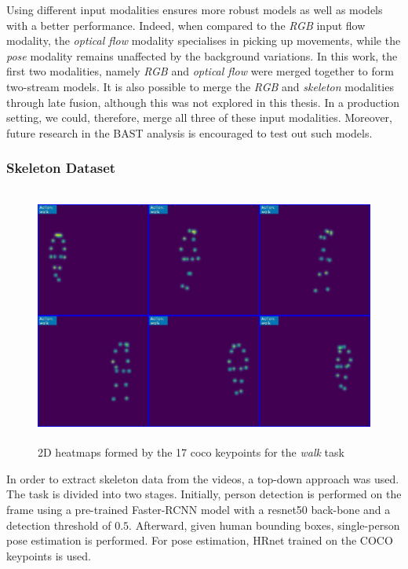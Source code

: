 \documentclass[extern,palatino]{cgMA}
\begin{document}
\bigskip
\noindent Using different input modalities ensures more robust models as well as models with a better performance. Indeed, when compared to the \textit{RGB} input flow modality, the \textit{optical flow} modality specialises in picking up movements, while the \textit{pose} modality remains unaffected by the background variations. In this work, the first two modalities, namely \textit{RGB} and \textit{optical flow} were merged together to form two-stream models. It is also possible to merge the \textit{RGB} and \textit{skeleton} modalities through late fusion, although this was not explored in this thesis. In a production setting, we could, therefore, merge all three of these input modalities. Moreover, future research in the BAST analysis is encouraged to test out such models.

\subsubsection{Skeleton Dataset}

\begin{figure}[h]
\center
\includegraphics[height={240pt}, width={370pt}]{Thesis/images/walk_heatmap.jpg}
\caption{2D heatmaps formed by the 17 coco keypoints for the \textit{walk} task}
\label{walk_heatmap}
\end{figure}

\noindent In order to extract skeleton data from the videos, a top-down approach was used. The task is divided into two stages. Initially, person detection is performed on the frame using a pre-trained Faster-RCNN model \cite{ren2015faster} with a resnet50 back-bone and a detection threshold of $0.5$. Afterward, given human bounding boxes, single-person pose estimation is performed. For pose estimation, HRnet \cite{wang2020deep} trained on the COCO keypoints \cite{lin2014microsoft} is used.
\end{document}
